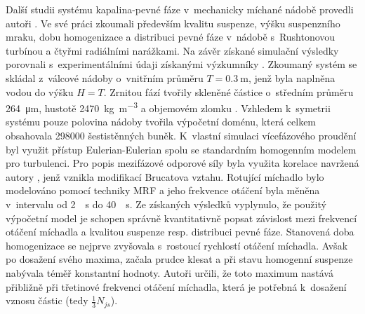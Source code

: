 Další studii systému kapalina-pevné fáze v~mechanicky míchané nádobě provedli autoři \citet{kas08}. Ve své práci zkoumali především kvalitu suspenze, výšku suspenzního mraku, dobu homogenizace a distribuci pevné fáze v~nádobě s~Rushtonovou turbínou a čtyřmi radiálními narážkami. Na závěr získané simulační výsledky porovnali s~experimentálními údaji získanými výzkumníky \citet{yama08}. Zkoumaný systém se skládal z~válcové nádoby o~vnitřním průměru $T=\SI{0.3}{\meter}$, jenž byla naplněna vodou do výšku $H=T$. Zrnitou fází tvořily skleněné částice o~středním průměru \SI{264}{\micro\meter}, hustotě \SI{2470}{\kilogram\per\cubic\meter} a objemovém zlomku . Vzhledem k~symetrii systému pouze polovina nádoby tvořila výpočetní doménu, která celkem obsahovala \num{298000} šestistěnných buněk. K~vlastní simulaci vícefázového proudění byl využit přístup Eulerian-Eulerian spolu se standardním homogenním \keps{} modelem pro turbulenci. Pro popis mezifázové odporové síly byla využita korelace navržená autory \citet{kho06}, jenž vznikla modifikací Brucatova vztahu. Rotující míchadlo bylo modelováno pomocí techniky MRF a jeho frekvence otáčení byla měněna v~intervalu od \SI{2}{\per\second} do \SI{40}{\per\second}. Ze získaných výsledků vyplynulo, že použitý výpočetní model je schopen správně kvantitativně popsat závislost mezi frekvencí otáčení míchadla a kvalitou suspenze resp. distribuci pevné fáze. Stanovená doba homogenizace se nejprve zvyšovala s~rostoucí rychlostí otáčení míchadla. Avšak po dosažení svého maxima, začala prudce klesat a při stavu homogenní suspenze nabývala téměř konstantní hodnoty. Autoři určili, že toto maximum nastává přibližně při třetinové frekvenci otáčení míchadla, která je potřebná k~dosažení vznosu částic (tedy $\frac{1}{3}N_{js}$).

